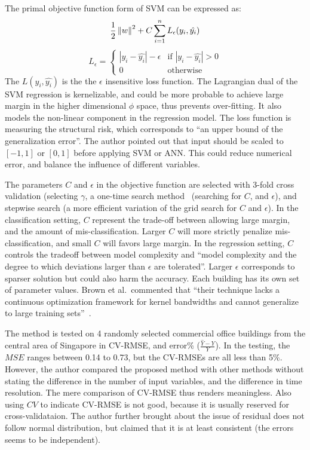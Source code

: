 \documentclass[12pt]{article}
\begin{document}
The primal objective function form of SVM can be expressed as:
\begin{equation}
  \label{eq:svm}
  \frac{1}{2}\left\|w\right\|^2 + C \sum_{i = 1}^nL_{\epsilon}(y_i, \hat{y_i})\\
\end{equation}
\begin{equation}
  L_{\epsilon} = \begin{cases}
    \left|y_i - \hat{y_i}\right| - \epsilon &\text{if $\left|y_i - \hat{y_i}\right| > 0$}\\
    0 &\text{otherwise}
    \end{cases}
\end{equation}
The $L(y_i, \hat{y_i})$ is the the $\epsilon$ insensitive loss
function. The Lagrangian dual of the SVM regression is kernelizable,
and could be more probable to achieve large margin in the higher
dimensional $\phi$ space, thus prevents over-fitting. It also models
the non-linear component in the regression model. The loss function is
measuring the structural risk, which corresponds to ``an upper bound
of the generalization error''. The author pointed out that input
should be scaled to $[-1, 1]$ or $[0, 1]$ before applying SVM or ANN.
This could reduce numerical error, and balance the influence of
different variables.

The parameters $C$ and $\epsilon$ in the objective function are
selected with 3-fold cross validation (selecting $\gamma$, a one-time
search method~\cite{cao2003support} (searching for $C$, and
$\epsilon$), and stepwise search (a more efficient variation of the
grid search for $C$ and $\epsilon$). In the classification setting,
$C$ represent the trade-off between allowing large margin, and the
amount of mis-classification. Larger $C$ will more strictly penalize
mis-classification, and small $C$ will favors large margin. In the
regression setting, $C$ controls the tradeoff between model complexity
and ``model complexity and the degree to which deviations larger than
$\epsilon$ are tolerated''. Larger $\epsilon$ corresponds to sparser
solution but could also harm the accuracy. Each building has its own
set of parameter values. Brown et al.\ commented that ``their technique lacks a
continuous optimization framework for kernel bandwidths
and cannot generalize to large training sets''~\cite{brown2012kernel}.

The method is tested on 4 randomly selected commercial office
buildings from the central area of Singapore in CV-RMSE, and error\%
($\frac{\hat{Y} - Y}{Y}$). In the testing, the $MSE$ ranges between
0.14 to 0.73, but the CV-RMSEs are all less than 5\%. However, the
author compared the proposed method with other methods without stating
the difference in the number of input variables, and the difference
in time resolution. The mere comparison of CV-RMSE thus renders
meaningless. Also using $CV$ to indicate CV-RMSE is not good, because
it is usually reserved for cross-validataion. The author further
brought about the issue of residual does not follow normal
distribution, but claimed that it is at least consistent (the errors
seems to be independent).
\end{document}
